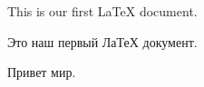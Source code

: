 \documentclass[a4paper,12pt]{article}
\begin{document}
This is our first LaTeX document.

Это наш первый ЛаТеХ документ.

Привет мир.
\end{document}
